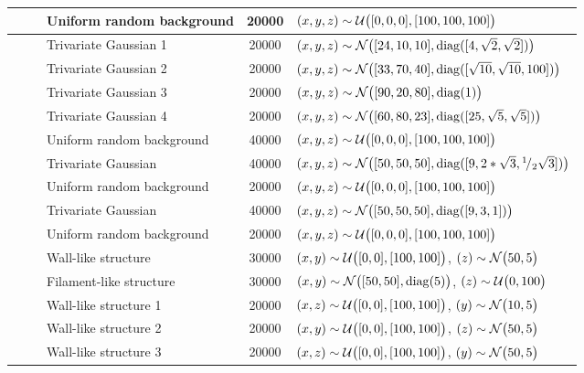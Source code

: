 \begin{tabular}{@{}cclS[table-format=+1.1e+1,scientific-notation=true,round-mode=places,round-precision=1]l@{}}
~ 				&	& Uniform random background	& 20000		& $(x, y, z) \sim \mathcal{U}\big([0, 0, 0], [100, 100, 100]\big)$\\
\hline
\baakmanThree	&	& Trivariate Gaussian 1 	& 20000		& $(x, y, z) \sim \mathcal{N}\big([24, 10, 10], \operatorname{diag}([4, \sqrt{2}, \sqrt{2}])\big)$\\
~ 				&	& Trivariate Gaussian 2 	& 20000		& $(x, y, z) \sim \mathcal{N}\big([33, 70, 40], \operatorname{diag}([\sqrt{10}, \sqrt{10}, 100])\big)$\\
~ 				&	& Trivariate Gaussian 3 	& 20000		& $(x, y, z) \sim \mathcal{N}\big([90, 20, 80], \operatorname{diag}(1)\big)$\\
~ 				&	& Trivariate Gaussian 4 	& 20000		& $(x, y, z) \sim \mathcal{N}\big([60, 80, 23], \operatorname{diag}([25, \sqrt{5}, \sqrt{5}])\big)$\\
~ 				&	& Uniform random background	& 40000		& $(x, y, z) \sim \mathcal{U}\big([0, 0, 0], [100, 100, 100]\big)$\\
\hline
\baakmanFour	&	& Trivariate Gaussian 		& 40000		& $(x, y, z) \sim \mathcal{N}\big([50, 50, 50], \operatorname{diag}([9, 2 * \sqrt{3}, {}^{1}\!/_{2} \sqrt{3}])\big)$\\
~ 				&	& Uniform random background	& 20000		& $(x, y, z) \sim \mathcal{U}\big([0, 0, 0], [100, 100, 100]\big)$\\
\hline
\baakmanFive	&	& Trivariate Gaussian 		& 40000		& $(x, y, z) \sim \mathcal{N}\big([50, 50, 50], \operatorname{diag}([9, 3, 1])\big)$\\
~ 				&	& Uniform random background	& 20000		& $(x, y, z) \sim \mathcal{U}\big([0, 0, 0], [100, 100, 100]\big)$\\
\hline
\ferdosiFour 	&	& Wall-like structure 		& 30000		& $(x, y) \sim \mathcal{U}\big([0, 0], [100, 100]\big)$, $(z) \sim \mathcal{N}\big(50, 5\big)$\\
~ 				&	& Filament-like structure 	& 30000		& $(x, y) \sim \mathcal{N}\big([50, 50], \operatorname{diag}(5)\big)$, $(z) \sim \mathcal{U}\big(0, 100\big)$\\
\hline
\ferdosiFive 	&	& Wall-like structure 1 	& 20000		& $(x, z) \sim \mathcal{U}\big([0, 0], [100, 100]\big)$, $(y) \sim \mathcal{N}\big(10, 5\big)$\\
~ 				&	& Wall-like structure 2 	& 20000		& $(x, y) \sim \mathcal{U}\big([0, 0], [100, 100]\big)$, $(z) \sim \mathcal{N}\big(50, 5\big)$\\
~ 				&	& Wall-like structure 3		& 20000		& $(x, z) \sim \mathcal{U}\big([0, 0], [100, 100]\big)$, $(y) \sim \mathcal{N}\big(50, 5\big)$\\
\bottomrule
\end{tabular}